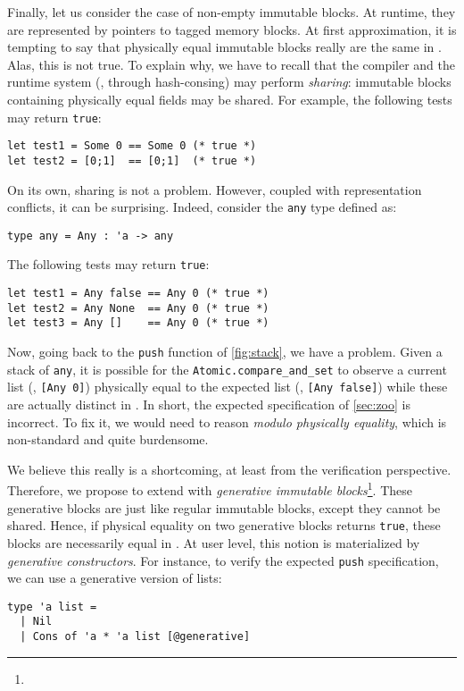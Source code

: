 Finally, let us consider the case of non-empty immutable blocks.
At runtime, they are represented by pointers to tagged memory blocks.
At first approximation, it is tempting to say that physically equal immutable blocks really are the same in \Rocq.
Alas, this is not true.
To explain why, we have to recall that the \OCaml compiler and the runtime system (\eg, through hash-consing) may perform \emph{sharing}: immutable blocks containing physically equal fields may be shared.
For example, the following tests may return \texttt{true}:
\begin{verbatim}
let test1 = Some 0 == Some 0 (* true *)
let test2 = [0;1]  == [0;1]  (* true *)
\end{verbatim}

On its own, sharing is not a problem.
However, coupled with representation conflicts, it can be surprising.
Indeed, consider the \texttt{any} type defined as:
\begin{verbatim}
type any = Any : 'a -> any
\end{verbatim}

The following tests may return \texttt{true}:
\begin{verbatim}
let test1 = Any false == Any 0 (* true *)
let test2 = Any None  == Any 0 (* true *)
let test3 = Any []    == Any 0 (* true *)
\end{verbatim}

Now, going back to the \texttt{push} function of \cref{fig:stack}, we have a problem.
Given a stack of \texttt{any}, it is possible for the \texttt{Atomic.compare_and_set} to observe a current list (\eg, \texttt{[Any 0]}) physically equal to the expected list (\eg, \texttt{[Any false]}) while these are actually distinct in \Rocq.
In short, the expected specification of \cref{sec:zoo} is incorrect.
To fix it, we would need to reason \emph{modulo physically equality}, which is non-standard and quite burdensome.

We believe this really is a shortcoming, at least from the verification perspective.
Therefore, we propose to extend \OCaml with \emph{generative immutable blocks}\footnote{}.
These generative blocks are just like regular immutable blocks, except they cannot be shared.
Hence, if physical equality on two generative blocks returns \texttt{true}, these blocks are necessarily equal in \Rocq.
At user level, this notion is materialized by \emph{generative constructors}.
For instance, to verify the expected \texttt{push} specification, we can use a generative version of lists:
\begin{verbatim}
type 'a list =
  | Nil
  | Cons of 'a * 'a list [@generative]
\end{verbatim}

